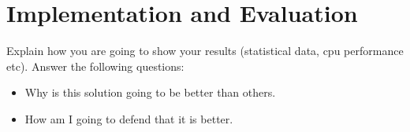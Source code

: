 
% 
% 
\section{Implementation and Evaluation}

Explain how you are going to show your results (statistical data, cpu performance etc). Answer the following questions:
\begin{itemize}
  \item Why is this solution going to be better than others.
  \item How am I going to defend that it is better.
\end{itemize}